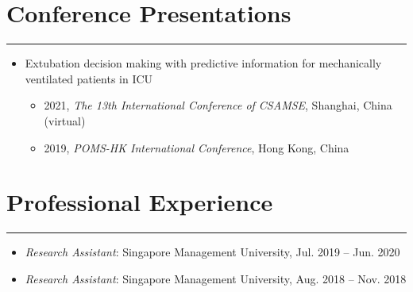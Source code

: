 \documentclass[12pt, a4paper]{article}
\begin{document}
{\begin{enumerate}[leftmargin=36pt, itemsep=6pt, parsep=0.2pt, topsep=1pt]
\end{enumerate}




\section*{Conference Presentations}
\vspace*{0.4em}
\hrule height 0.5pt
\begin{itemize}[leftmargin=36pt, itemsep=6pt, parsep=0.2pt, topsep=1pt]

	\item Extubation decision making with predictive information for mechanically ventilated patients in ICU

	\begin{itemize}[leftmargin=20pt, itemsep=2pt, topsep=2pt]

		\item 2021, {\it The 13th International Conference of CSAMSE}, Shanghai, China (virtual)

		\item 2019, {\it POMS-HK International Conference}, Hong Kong, China

	\end{itemize}

\end{itemize}




\section*{Professional Experience}
\vspace*{0.4em}
\hrule height 0.5pt
\begin{itemize}[leftmargin=36pt, itemsep=4pt, parsep=0.2pt, topsep=1pt]

	\item {\it Research Assistant}: Singapore Management University, Jul. 2019 -- Jun. 2020

	\item {\it Research Assistant}: Singapore Management University, Aug. 2018 -- Nov. 2018


\end{itemize}}
\end{document}
